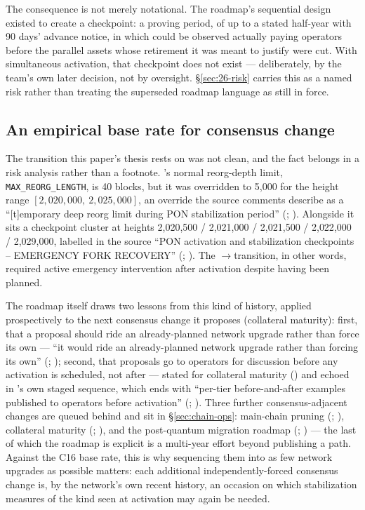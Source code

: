 The consequence is not merely notational. The roadmap's sequential design existed to create a
checkpoint: a proving period, of up to a stated half-year with 90 days' advance notice, in which
\PNR could be observed actually paying operators before the parallel assets whose retirement it was
meant to justify were cut. With simultaneous activation, that checkpoint does not exist —
deliberately, by the team's own later decision, not by oversight. \S\ref{sec:26-risk} carries this as
a named risk rather than treating the superseded roadmap language as still in force.

\subsection{An empirical base rate for consensus change}\label{sec:26-basrate}

The transition this paper's thesis rests on was not clean, and the fact belongs in a risk analysis
rather than a footnote. \fluxd's normal reorg-depth limit, \texttt{MAX\_REORG\_LENGTH}, is 40
blocks, but it was overridden to 5{,}000 for the height range $[2{,}020{,}000,\ 2{,}025{,}000]$, an
override the source comments describe as a ``[t]emporary deep reorg limit during PON stabilization
period'' (\shipped; ). Alongside it sits a checkpoint cluster
at heights 2{,}020{,}500 / 2{,}021{,}000 / 2{,}021{,}500 / 2{,}022{,}000 / 2{,}029{,}000, labelled in
the source ``PON activation and stabilization checkpoints -- EMERGENCY FORK RECOVERY'' (\shipped;
). The \PoW$\to$\PoN transition, in other words, required
active emergency intervention after activation despite having been planned.

The roadmap itself draws two lessons from this kind of history, applied prospectively to the next
consensus change it proposes (collateral maturity): first, that a proposal should ride an
already-planned network upgrade rather than force its own — ``it would ride an already-planned
network upgrade rather than forcing its own'' (\planned; );
second, that proposals go to operators for discussion before any activation is scheduled, not after
— stated for collateral maturity () and echoed in \PNR's own
staged sequence, which ends with ``per-tier before-and-after examples published to operators before
activation'' (\planned; ). Three further consensus-adjacent
changes are queued behind \PoN and sit in \S\ref{sec:chain-ops}: main-chain pruning (\planned;
), collateral maturity (\planned;
), and the post-quantum migration roadmap (\planned;
) — the last of which the roadmap is explicit is a
multi-year effort beyond publishing a path. Against the C16 base rate, this is why sequencing them
into as few network upgrades as possible matters: each additional independently-forced consensus
change is, by the network's own recent history, an occasion on which stabilization measures of the
kind seen at \PoN activation may again be needed.

